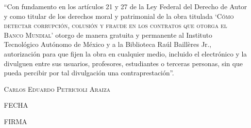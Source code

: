 \noindent ``Con fundamento en los artículos 21 y 27 de la Ley Federal del Derecho de Autor y como titular de los derechos moral y patrimonial de la obra titulada `{\scshape Cómo detectar corrupción, colusión y fraude en los contratos que otorga el Banco Mundial}' otorgo de manera gratuita y permanente al Instituto Tecnológico Autónomo de México y a la Biblioteca Raúl Baillères Jr., autorización para que fijen la obra en cualquier medio, incluido el electrónico y la divulguen entre sus usuarios, profesores, estudiantes o terceras personas, sin que pueda percibir por tal divulgación una contraprestación''.

\begin{center}

\bigskip

\bigskip

\bigskip

\scshape Carlos Eduardo Petricioli Araiza

\vfill

\makebox[3.5 in]{\hrulefill}

\bigskip

FECHA

\bigskip

\bigskip

\bigskip

\makebox[3.5 in]{\hrulefill}

\bigskip

FIRMA
\end{center}

\newpage

\thispagestyle{plain}












